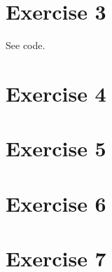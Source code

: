 \documentclass[a4paper]{article}
\begin{document}
\section*{Exercise 3}
See code.

\section*{Exercise 4}

\section*{Exercise 5}

\section*{Exercise 6}

\section*{Exercise 7}
\end{document}
